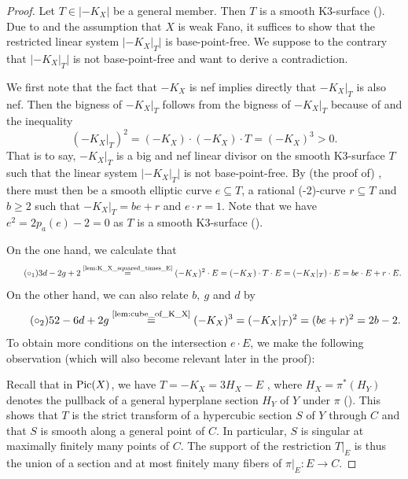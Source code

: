 \documentclass[english,11pt,reqno]{amsart}
\newcommand{\sub}{\subseteq}
\newcommand{\Pic}{\textup{Pic}}
\begin{document}
\begin{proof}
Let $T\in |-K_X|$ be a general member. Then $T$ is a smooth K3-surface (). Due to  and the assumption that $X$ is weak Fano, it suffices to show that the restricted linear system $|-K_X|_T|$ is base-point-free. We suppose to the contrary that $|-K_X|_T|$ is not base-point-free and want to derive a contradiction.\par 
We first note that the fact that $-K_X$ is nef implies directly that $-K_X|_T$ is also nef. Then the bigness of $-K_X|_T$ follows from the bigness of $-K_X|_T$ because of  and the inequality $$(-K_X|_T)^2 = (-K_X)\cdot(-K_X)\cdot T = (-K_X)^3 >0.$$
That is to say, $-K_X|_T$ is a big and nef linear divisor on the smooth K3-surface $T$ such that the linear system $|-K_X|_T|$ is not base-point-free. By (the proof of) \cite[Lemma 2.1]{Shin_3dimensional_Fano_varieties_with_canonical_singularities}, there must then be a smooth elliptic curve $e\sub T$, a rational (-2)-curve $r\sub T$ and $b\geq 2$ such that $-K_X|_T=be+r$ and $e\cdot r=1$. Note that we have $e^2=2p_a(e)-2=0$ as $T$ is a smooth K3-surface ().\par 
On the one hand, we calculate that
\begin{equation*} \tag{$\circ_1$} \label{eq:relation_d_g_b_1}
3d-2g+2\overset{\textup{\ref{lem:K_X_squared_times_E}}}{=} (-K_X)^2\cdot E= (-K_X)\cdot T \cdot E = (-K_X|_T)\cdot E = be\cdot E+r\cdot E.
\end{equation*}
On the other hand, we can also relate $b,\:g$ and $d$ by
\begin{equation*} \tag{$\circ_2$} \label{eq:relation_d_g_b_2}
52-6d+2g\overset{\textup{\ref{lem:cube_of_K_X}}}{=}(-K_X)^3 = (-K_X|_T)^2=(be+r)^2=2b-2.
\end{equation*}
To obtain more conditions on the intersection $e\cdot E$, we make the following observation (which will also become relevant later in the proof):\par 
Recall that in $\Pic(X)$, we have $T=-K_X=3H_X-E$ , where $H_X=\pi^*(H_Y)$ denotes the pullback of a general hyperplane section $H_Y$ of $Y$ under $\pi$ (). This shows that $T$ is the strict transform of a hypercubic section $S$ of $Y$ through $C$ and that $S$ is smooth along a general point of $C$. In particular, $S$ is singular at maximally finitely many points of $C$. The support of the restriction $T|_E$ is thus the union of a section and at most finitely many fibers of $\pi|_E:E\rightarrow C$. \par 

\end{proof}
\end{document}
